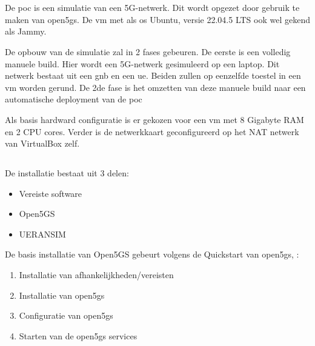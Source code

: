 \chapter{}%
\label{ch:poc}

\section{}%
\label{sec:sim}%
De \gls{poc} is een simulatie van een 5G-netwerk. Dit wordt opgezet door gebruik te maken van \gls{open5gs}. De \gls{vm} met als \gls{os} Ubuntu, versie 22.04.5 LTS ook wel gekend als Jammy. 

De opbouw van de simulatie zal in 2 fases gebeuren. De eerste is een volledig manuele build. Hier wordt een 5G-netwerk gesimuleerd op een laptop. Dit netwerk bestaat uit een \gls{gnb} en een \gls{ue}. Beiden zullen op eenzelfde toestel in een \gls{vm} worden gerund. De 2de fase is het omzetten van deze manuele build naar een automatische deployment van de \gls{poc}

Als basis hardward configuratie is er gekozen voor een \gls{vm} met 8 Gigabyte RAM en 2 CPU cores. Verder is de netwerkkaart geconfigureerd op het NAT netwerk van VirtualBox zelf.

\section{}%
\label{sec:installation}%

De installatie bestaat uit 3 delen:

\begin{itemize}
    \item Vereiste software
    \item Open5GS
    \item UERANSIM
\end{itemize}

De basis installatie van Open5GS gebeurt volgens de Quickstart van \gls{open5gs}, \textcite{Lee2025a}:

\begin{enumerate}
    \item Installatie van afhankelijkheden/vereisten
    \item Installatie van \gls{open5gs}
    \item Configuratie van \gls{open5gs}
    \item Starten van de \gls{open5gs} services
\end{enumerate}

